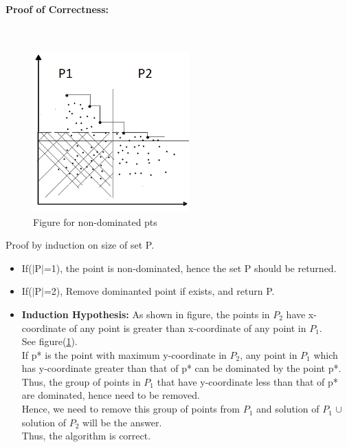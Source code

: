 \documentclass[pdftex,a4paper,12pt]{report}
\begin{document}
\paragraph{Proof of Correctness:} \makebox[2pt]{}\\
\begin{figure}[ht!]
\centering
\includegraphics[width=60mm]{p2.png}
\caption{Figure for non-dominated pts}
\label{figp2}
\end{figure}

Proof by induction on size of set P.
\begin{itemize}
 \item If($\mid$P$\mid$=1), the point is non-dominated, hence the set P should be returned.
 \item If($\mid$P$\mid$=2), Remove dominanted point if exists, and return P.
 \item \textbf{Induction Hypothesis: } 
 As shown in figure, the points in $P_2$ have x-coordinate of any point is greater than x-coordinate of any point in $P_1$.\\
 See figure(\ref{figp2}).\\
 If p* is the point with maximum y-coordinate in $P_2$, any point in $P_1$ which has y-coordinate greater than that of p* can be dominated by the point
  p*.\\
 Thus, the group of points in $P_1$ that have y-coordinate less than that of p* are dominated, hence need to be removed.\\
 Hence, we need to remove this group of points from $P_1$ and solution of $P_1$ $ \cup$ solution of $P_2$ will be the answer.\\
 Thus, the algorithm is correct.
\end{itemize}
\newpage
\end{document}
